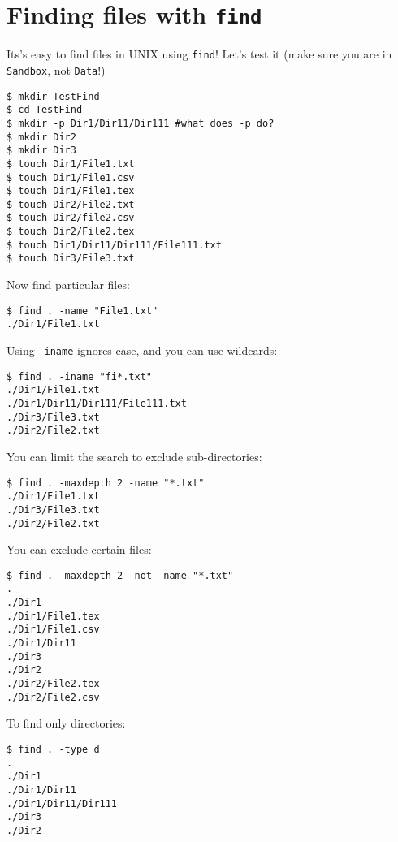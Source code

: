 \section{Finding files with {\tt find}}

Its's easy to find files in UNIX using {\tt find}! Let's test it (make 
sure you are in {\tt Sandbox}, not {\tt Data}!)
 
\begin{lstlisting}
$ mkdir TestFind
$ cd TestFind
$ mkdir -p Dir1/Dir11/Dir111 #what does -p do?
$ mkdir Dir2
$ mkdir Dir3
$ touch Dir1/File1.txt
$ touch Dir1/File1.csv
$ touch Dir1/File1.tex
$ touch Dir2/File2.txt
$ touch Dir2/file2.csv
$ touch Dir2/File2.tex
$ touch Dir1/Dir11/Dir111/File111.txt
$ touch Dir3/File3.txt
\end{lstlisting}

Now find particular files:
 
\begin{lstlisting}
$ find . -name "File1.txt"
./Dir1/File1.txt
\end{lstlisting}

Using {\tt -iname} ignores case, and you can use wildcards:
 
\begin{lstlisting}
$ find . -iname "fi*.txt"
./Dir1/File1.txt
./Dir1/Dir11/Dir111/File111.txt
./Dir3/File3.txt
./Dir2/File2.txt
\end{lstlisting}

You can limit the search to exclude sub-directories:
 
\begin{lstlisting}
$ find . -maxdepth 2 -name "*.txt"
./Dir1/File1.txt
./Dir3/File3.txt
./Dir2/File2.txt
\end{lstlisting}

You can exclude certain files:
 
\begin{lstlisting}
$ find . -maxdepth 2 -not -name "*.txt"
.
./Dir1
./Dir1/File1.tex
./Dir1/File1.csv
./Dir1/Dir11
./Dir3
./Dir2
./Dir2/File2.tex
./Dir2/File2.csv
\end{lstlisting}

To find only directories:
 
\begin{lstlisting}
$ find . -type d
.
./Dir1
./Dir1/Dir11
./Dir1/Dir11/Dir111
./Dir3
./Dir2
\end{lstlisting}

